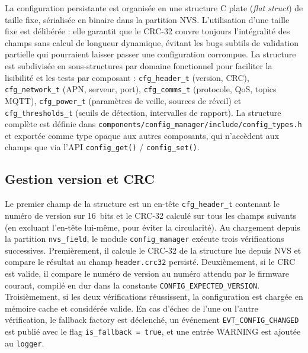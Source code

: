 La configuration persistante est organisée en une structure C plate
(\textit{flat struct}) de taille fixe, sérialisée en binaire dans
la partition NVS. L'utilisation d'une taille fixe est délibérée :
elle garantit que le CRC-32 couvre toujours l'intégralité des champs
sans calcul de longueur dynamique, évitant les bugs subtils de
validation partielle qui pourraient laisser passer une configuration
corrompue. La structure est subdivisée en sous-structures par domaine
fonctionnel pour faciliter la lisibilité et les tests par composant :
\texttt{cfg\_header\_t} (version, CRC), \texttt{cfg\_network\_t}
(APN, serveur, port), \texttt{cfg\_comms\_t} (protocole, QoS, topics
MQTT), \texttt{cfg\_power\_t} (paramètres de veille, sources de
réveil) et \texttt{cfg\_thresholds\_t} (seuils de détection, intervalles
de rapport). La structure complète est définie dans
\texttt{components/config\_manager/include/config\_types.h} et
exportée comme type opaque aux autres composants, qui n'accèdent
aux champs que via l'API \texttt{config\_get()} / \texttt{config\_set()}.

\subsection{Gestion version et CRC}
\label{subsec:config_crc}

Le premier champ de la structure est un en-tête \texttt{cfg\_header\_t}
contenant le numéro de version sur 16~bits et le CRC-32 calculé sur
tous les champs suivants (en excluant l'en-tête lui-même, pour éviter
la circularité). Au chargement depuis la partition \texttt{nvs\_field},
le module \texttt{config\_manager} exécute trois vérifications
successives. Premièrement, il calcule le CRC-32 de la structure lue
depuis NVS et compare le résultat au champ \texttt{header.crc32}
persisté. Deuxièmement, si le CRC est valide, il compare le numéro
de version au numéro attendu par le firmware courant, compilé en dur
dans la constante \texttt{CONFIG\_EXPECTED\_VERSION}. Troisièmement,
si les deux vérifications réussissent, la configuration est chargée
en mémoire cache et considérée valide. En cas d'échec de l'une ou
l'autre vérification, le fallback factory est déclenché, un événement
\texttt{EVT\_CONFIG\_CHANGED} est publié avec le flag
\texttt{is\_fallback = true}, et une entrée WARNING est ajoutée
au \texttt{logger}.

